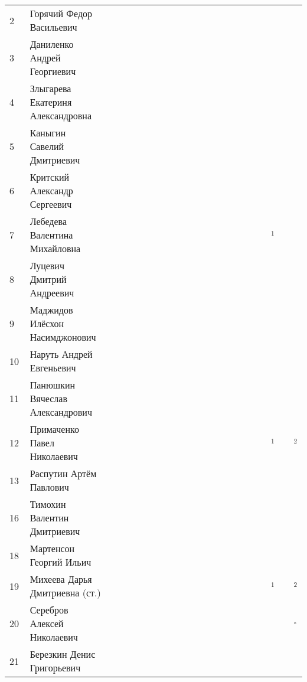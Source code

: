 \documentclass[a4paper,landscape,11pt]{article}
\newcommand*\OK{&\small \ding{51}$\!\!_\circ$} %
\newcommand*\ok{&{\small \ding{51}}} %
\newcommand*\no{&{\small }} %
\newcommand*\da{&{\small\ding{48}$\!\!_1$}} %
\newcommand*\db{&{\small\ding{48}$\!\!_2$}} %
\begin{document}
\begin{tabular}{p{7pt}|l|p{6pt}p{6pt}p{6pt}p{6pt}p{6pt}p{6pt}p{6pt}p{6pt}p{6pt}p{6pt}p{6pt}p{6pt}p{6pt}p{6pt}p{6pt}p{6pt}p{6pt}p{6pt}p{6pt}p{6pt}}
 2\,&Горячий Федор Васильевич         \,\ok\no\ok\ok\ok\ok\ok\ok\ok\ok\ok\ok\no\no\ok\no\ok\no\ok\no\\
 3\,&Даниленко Андрей Георгиевич        \ok\ok\ok\no\ok\ok\no\no\ok\ok\ok\ok\no\no\no\no\no\no\\
 4\,&Злыгарева Екатериня Александровна  \no\no\no\no\no\no\no\no\no\\
 5\,&Каныгин Савелий Дмитриевич         \ok\ok\ok\ok\ok\ok\ok\no\ok\ok\ok\ok\ok\ok\ok\ok\ok\ok\ok\ok\\
 6\,&Критский Александр Сергеевич       \no\no\no\no\no\no\no\no\no\\
 7\,&Лебедева Валентина Михайловна      \ok\ok\ok\ok\ok\ok\ok\ok\ok\ok\ok\ok\ok\ok\ok\ok\ok\da\ok\ok\\
 8\,&Луцевич Дмитрий Андреевич          \ok\ok\ok\ok\ok\ok\ok\no\ok\ok\ok\ok\ok\ok\\
 9\,&Маджидов Илёсхон Насимджонович     \no\no\no\no\no\no\no\no\no\\
10\,&Наруть Андрей Евгеньевич           \no\no\no\no\no\no\no\no\no\no\no\no\no\no\ok\no\ok\ok\no\no\\
11\,&Панюшкин Вячеслав Александрович    \ok\ok\ok\no\ok\ok\no\no\ok\ok\no\no\ok\no\ok\ok\ok\ok\no\no\\
\midrule
12\,&Примаченко Павел Николаевич        \ok\ok\ok\ok\ok\ok\ok\ok\ok\ok\ok\ok\ok\ok\ok\ok\ok\da\ok\db\\
13\,&Распутин Артём Павлович            \ok\ok\no\no\no\no\ok\ok\no\no\ok\ok\no\ok\ok\ok\ok\ok\ok\ok\\
16\,&Тимохин Валентин Дмитриевич        \ok\ok\ok\ok\ok\ok\ok\ok\ok\ok\ok\ok\no\no\ok\no\ok\no\no\no\\
18\,&Мартенсон Георгий Ильич            \ok\ok\ok\ok\ok\ok\ok\ok\ok\ok\ok\ok\ok\ok\ok\ok\ok\ok\no\no\\
19\,&Михеева Дарья Дмитриевна (ст.)     \ok\ok\ok\ok\ok\ok\ok\ok\ok\ok\ok\ok\ok\ok\ok\ok\ok\da\ok\db\\
20\,&Серебров Алексей Николаевич        \ok\ok\ok\ok\ok\ok\no\ok\ok\ok\ok\ok\ok\ok\ok\ok\ok\ok\ok\OK\\
21\,&Березкин Денис Григорьевич         \no\no\no\no\ok\ok\no\no\no\no\ok\ok\no\no\no\no\no\no\\
\bottomrule
\end{tabular} 
\end{document}
